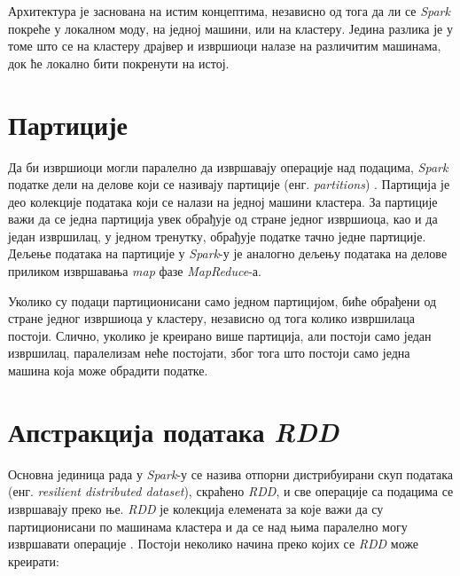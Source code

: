 \documentclass[12pt,oneside]{memoir}
\begin{document}
Архитектура је заснована на истим концептима, независно од тога да ли се \textit{Spark} покреће у локалном моду, на једној машини, или на кластеру. Једина разлика је у томе што се на кластеру драјвер и извршиоци налазе на различитим машинама, док ће локално бити покренути на истој.

\section{Партиције}
\label{sec:spark_partic}

Да би извршиоци могли паралелно да извршавају операције над подацима, \textit{Spark} податке дели на делове који се називају партиције (енг. \textit{partitions}) \cite{spark_guide}. Партиција је део колекције података који се налази на једној машини кластера. За партиције важи да се једна партиција увек обрађује од стране једног извршиоца, као и да један извршилац, у једном тренутку, обрађује податке тачно једне партиције. Дељење података на партиције у \textit{Spark}-у је аналогно дељењу података на делове  приликом извршавања \textit{map} фазе \textit{MapReduce}-а.



Уколико су подаци партиционисани само једном партицијом, биће обрађени од стране једног извршиоца у кластеру, независно од тога колико извршилаца постоји. Слично, уколико је креирано више партиција, али постоји само један извршилац, паралелизам неће постојати, због тога што постоји само једна машина која може обрадити податке.

\section{Апстракција података \textit{RDD}}
\label{sec:spark_rdd}

Основна јединица рада у \textit{Spark}-у се назива отпорни дистрибуирани скуп података (енг. \textit{resilient distributed dataset}), скраћено \textit{RDD}, и све операције са подацима се извршавају преко ње. \textit{RDD} је колекција елемената за које важи да су партиционисани по машинама кластера и да се над њима паралелно могу извршавати операције \cite{spark_rdd}. Постоји неколико начина преко којих се \textit{RDD} може креирати:
\end{document}
